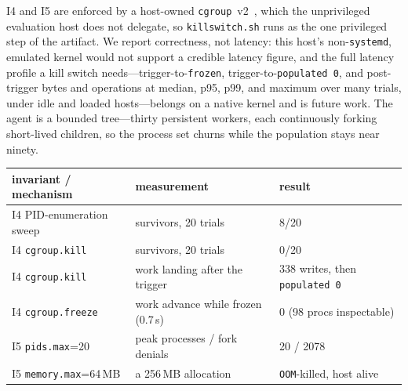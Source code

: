 \documentclass[11pt]{article}
\begin{document}
I4 and I5 are enforced by a host-owned \texttt{cgroup}~v2~\cite{cgroup2}, which the unprivileged evaluation
host does not delegate, so \texttt{killswitch.sh} runs as the one privileged step of the artifact. We
report correctness, not latency: this host's non-\texttt{systemd}, emulated kernel would not support a
credible latency figure, and the full latency profile a kill switch needs---trigger-to-\texttt{frozen},
trigger-to-\texttt{populated~0}, and post-trigger bytes and operations at median, p95, p99, and maximum
over many trials, under idle and loaded hosts---belongs on a native kernel and is future work. The agent
is a bounded tree---thirty persistent workers, each continuously forking short-lived children, so the
process set churns while the population stays near ninety.

\begin{center}
\begin{tabular}{lll}
\toprule
invariant / mechanism & measurement & result \\
\midrule
I4 PID-enumeration sweep & survivors, 20 trials & 8/20 \\
I4 \texttt{cgroup.kill} & survivors, 20 trials & 0/20 \\
I4 \texttt{cgroup.kill} & work landing after the trigger & 338 writes, then \texttt{populated 0} \\
I4 \texttt{cgroup.freeze} & work advance while frozen (0.7\,s) & 0 (98 procs inspectable) \\
I5 \texttt{pids.max}=20 & peak processes / fork denials & 20 / 2078 \\
I5 \texttt{memory.max}=64\,MB & a 256\,MB allocation & \texttt{OOM}-killed, host alive \\
\bottomrule
\end{tabular}
\end{center}
\end{document}
